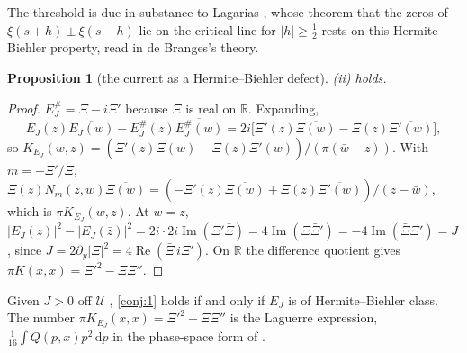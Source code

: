 \documentclass[11pt]{article}
\newtheorem{proposition}[theorem]{Proposition}
\theoremstyle{definition}\newtheorem{definition}[theorem]{Definition}
\theoremstyle{remark}\newtheorem{remark}[theorem]{Remark}
\newcommand{\R}{\mathbb R}\newcommand{\C}{\mathbb C}\newcommand{\N}{\mathbb N}
\newcommand{\dd}{\,\mathrm d}\newcommand{\e}{\mathrm e}
\renewcommand{\Re}{\operatorname{Re}}\renewcommand{\Im}{\operatorname{Im}}
\begin{document}
The threshold is due in substance to Lagarias \cite{Lagarias05}, whose theorem that the zeros of $\xi(s+h)\pm\xi(s-h)$ lie on the critical line for $|h|\ge\frac12$ rests on this Hermite--Biehler property, read in de Branges's theory.

\begin{proposition}[the current as a Hermite--Biehler defect]\label{prop:hbdefect}
(ii) holds.
\end{proposition}
\begin{proof}
$E_J^\#=\Xi-i\Xi'$ because $\Xi$ is real on $\R$. Expanding,
\[
E_J(z)\overline{E_J(w)}-E_J^\#(z)\overline{E_J^\#(w)}=2i\bigl[\Xi'(z)\overline{\Xi(w)}-\Xi(z)\overline{\Xi'(w)}\bigr],
\]
so $K_{E_J}(w,z)=(\Xi'(z)\overline{\Xi(w)}-\Xi(z)\overline{\Xi'(w)})/(\pi(\bar w-z))$. With $m=-\Xi'/\Xi$, $\Xi(z)N_m(z,w)\overline{\Xi(w)}=(-\Xi'(z)\overline{\Xi(w)}+\Xi(z)\overline{\Xi'(w)})/(z-\bar w)$, which is $\pi K_{E_J}(w,z)$. At $w=z$, $|E_J(z)|^2-|E_J(\bar z)|^2=2i\cdot2i\Im(\Xi'\bar\Xi)=4\Im(\Xi\bar\Xi')=-4\Im(\bar\Xi\Xi')=J$, since $J=2\partial_y|\Xi|^2=4\Re(\bar\Xi\,i\Xi')$. On $\R$ the difference quotient gives $\pi K(x,x)=\Xi'^2-\Xi\Xi''$.
\end{proof}

Given $J>0$ off $\mathcal U$ \cite{S01}, \cref{conj:1} holds if and only if $E_J$ is of Hermite--Biehler class. The number $\pi K_{E_J}(x,x)=\Xi'^2-\Xi\Xi''$ is the Laguerre expression, $\frac1{16}\int Q(p,x)p^2\dd p$ in the phase-space form of \cite{S01}.
\end{document}
